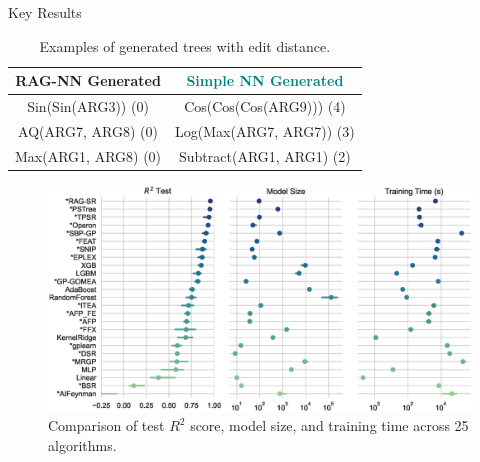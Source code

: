\documentclass[final]{beamer}
\newcommand{\hlpurple}[1]{\textcolor{accent}{#1}}
\newcommand{\hlteal}[1]{\textcolor{teal}{#1}}
\newlength{\onecolwid}
\begin{document}
\begin{frame}[t]
\begin{columns}[t]
\begin{column}{\onecolwid}
                \begin{block}{Key Results}
                    \begin{table}
                        \centering
                        \small
                        \begin{tabular}{cc}
                            \toprule
                            \textbf{\hlpurple{RAG-NN Generated}} & \textbf{\hlteal{Simple NN Generated}} \\
                            \midrule
                            Sin(Sin(ARG3)) (0)                   & Cos(Cos(Cos(ARG9))) (4)               \\
                            AQ(ARG7, ARG8) (0)                   & Log(Max(ARG7, ARG7)) (3)              \\
                            Max(ARG1, ARG8) (0)                  & Subtract(ARG1, ARG1) (2)              \\
                            \bottomrule
                        \end{tabular}
                        \caption{Examples of generated trees with edit distance.}
                    \end{table}
                    \vspace{-5mm}

                    \begin{figure}
                        \centering
                        \includegraphics[width=\linewidth, trim=5 5 5 5, clip]{figs/pairgrid-pointplot_r2_test_model_size_training-time-(s).eps}
                        \caption{Comparison of test $R^2$ score, model size, and training time across 25 algorithms.}
                    \end{figure}



\end{block}
\end{column}
\end{columns}
\end{frame}
\end{document}

